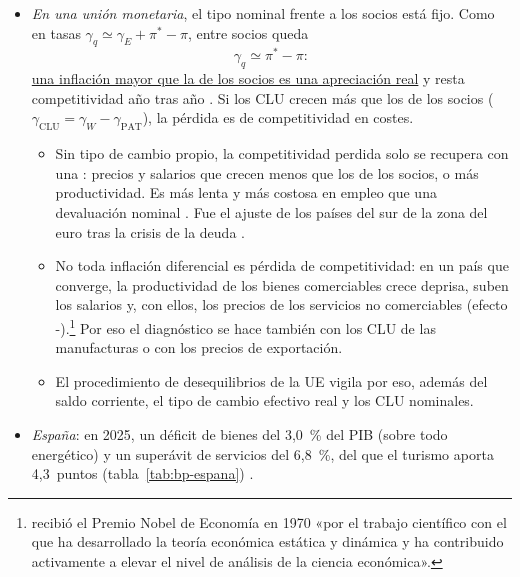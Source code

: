\documentclass[11pt]{article}
\begin{document}
\begin{itemize}
\begin{itemize}
  \item \emph{Competitividad no precio}: capital físico, humano y tecnológico, calidad, marca, instituciones y clima de negocios.\footnote{El Banco Mundial dejó de publicar el \emph{Doing Business} en septiembre de 2021, tras detectar irregularidades en los datos publicados en 2018 y 2020\nocite{BM2021DoingBusiness}. Lo sustituye el \emph{Business Ready} (B-READY), que mide el marco regulador, los servicios públicos y la eficiencia operativa de las empresas: cubrió 50~economías en 2024 y 101~en 2025\nocite{BM2025BREADY}.}
  \item \emph{Resultados}: la \emph{cuota de mercado} de las exportaciones, que resume las 2~anteriores; la \emph{tasa de cobertura}, $X/M$; la \emph{propensión exportadora}, $X/\mathrm{PIB}$, y el \emph{contenido importado de las exportaciones}, que mide la participación en las cadenas de valor.
  \end{itemize}
\item \emph{En una unión monetaria}, el tipo nominal frente a los socios está fijo. Como en tasas $\gamma_q\simeq\gamma_E+\pi^*-\pi$, entre socios queda
\[
\gamma_q\simeq\pi^*-\pi :
\]
\uline{una inflación mayor que la de los socios es una apreciación real} y resta competitividad año tras año . Si los CLU crecen más que los de los socios ($\gamma_{\mathrm{CLU}}=\gamma_W-\gamma_{\mathrm{PAT}}$), la pérdida es de competitividad en costes.
  \begin{itemize}
  \item Sin tipo de cambio propio, la competitividad perdida solo se recupera con una : precios y salarios que crecen menos que los de los socios, o más productividad. Es más lenta y más costosa en empleo que una devaluación nominal . Fue el ajuste de los países del sur de la zona del euro tras la crisis de la deuda .
  \item No toda inflación diferencial es pérdida de competitividad: en un país que converge, la productividad de los bienes comerciables crece deprisa, suben los salarios y, con ellos, los precios de los servicios no comerciables (efecto -)\nocite{Balassa1964,Samuelson1964}.\footnote{ recibió el Premio Nobel de Economía en 1970 «por el trabajo científico con el que ha desarrollado la teoría económica estática y dinámica y ha contribuido activamente a elevar el nivel de análisis de la ciencia económica»\nocite{Nobel1970Samuelson}.} Por eso el diagnóstico se hace también con los CLU de las manufacturas o con los precios de exportación.
  \item El procedimiento de desequilibrios de la UE vigila por eso, además del saldo corriente, el tipo de cambio efectivo real y los CLU nominales\nocite{CE2025AMR2026}.
  \end{itemize}
\item \emph{España}: en 2025, un déficit de bienes del 3,0~\% del PIB (sobre todo energético) y un superávit de servicios del 6,8~\%, del que el turismo aporta 4,3~puntos (tabla~\ref{tab:bp-espana})\nocite{BdE2026BE17} .
\end{itemize}
\end{document}
